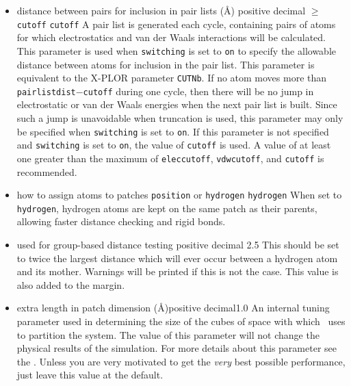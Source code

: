 \begin{itemize}
\item
{}
{distance between pairs for inclusion in pair lists (\AA)}
{positive decimal $\geq$ \verb!cutoff!}
{\verb!cutoff!}
{
A pair list is generated each cycle, 
containing pairs of atoms for which 
electrostatics and van der Waals interactions will be calculated.
This parameter is used when \verb!switching! is set to \verb!on! to
specify the allowable distance between atoms for inclusion in the
pair list.  
This parameter is equivalent to the X-PLOR parameter \verb!CUTNb!.
If no atom moves more than \verb!pairlistdist!$-$\verb!cutoff! during
one cycle, then there will be no jump in electrostatic or van der
Waals energies when the next pair list is built.  Since such a jump
is unavoidable when truncation is used, this parameter may only
be specified when \verb!switching! is set to \verb!on!.  If this
parameter is not specified and \verb!switching! is set to \verb!on!,
the value of \verb!cutoff! is used.  
A value of at least one greater than the maximum of 
\verb!eleccutoff!, \verb!vdwcutoff!, and \verb!cutoff! 
is recommended.  
}

\item
{}
{how to assign atoms to patches}
{\verb!position! or \verb!hydrogen!}
{\verb!hydrogen!}
{
When set to \verb!hydrogen!, hydrogen atoms are kept on the same patch as their parents, allowing faster distance checking and rigid bonds.
}

\item
{}
{used for group-based distance testing}
{positive decimal}
{2.5}
{
This should be set to twice the largest distance which will ever occur between a hydrogen atom and its mother.  Warnings will be printed if this is not the case.  This value is also added to the margin.
}

\item
{}
{extra length in patch dimension (\AA)}{positive decimal}{1.0}
{An internal tuning parameter used in determining the size of the cubes 
of space with which \NAMD\ uses to partition the system.  The value of 
this parameter will not change the physical results of the simulation.  
For more details about this parameter see the \PG.  
Unless you are very motivated to get the {\it very} best 
possible performance, just leave this value at the default.}


\end{itemize}

